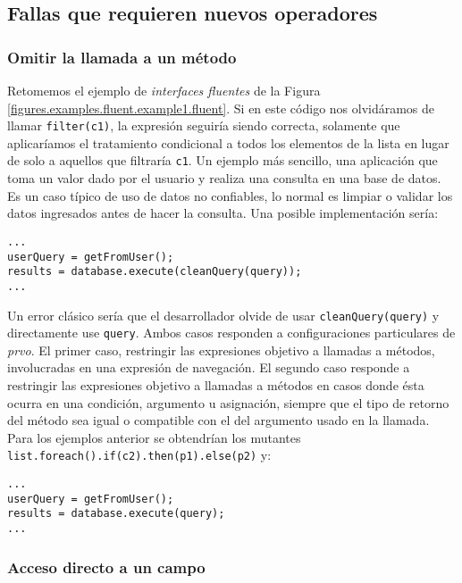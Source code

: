 \subsection{Fallas que requieren nuevos operadores}

\subsubsection{Omitir la llamada a un m\'etodo}

Retomemos el ejemplo de \emph{interfaces fluentes} de la Figura \ref{figures.examples.fluent.example1.fluent}. Si en este c\'odigo nos olvid\'aramos de llamar \texttt{filter(c1)}, la expresi\'on seguir\'ia siendo correcta, solamente que aplicar\'iamos el tratamiento condicional a todos los elementos de la lista en lugar de solo a aquellos que filtrar\'ia \texttt{c1}. Un ejemplo m\'as sencillo, una aplicaci\'on que toma un valor dado por el usuario y realiza una consulta en una base de datos. Es un caso t\'ipico de uso de datos no confiables, lo normal es limpiar o validar los datos ingresados antes de hacer la consulta. Una posible implementaci\'on ser\'ia:
\begin{lstlisting}
...
userQuery = getFromUser();
results = database.execute(cleanQuery(query));
...
\end{lstlisting}
Un error cl\'asico ser\'ia que el desarrollador olvide de usar \texttt{cleanQuery(query)} y directamente use \texttt{query}. Ambos casos responden a configuraciones particulares de \emph{prvo}. El primer caso, restringir las expresiones objetivo a llamadas a m\'etodos, involucradas en una expresi\'on de navegaci\'on. El segundo caso responde a restringir las expresiones objetivo a llamadas a m\'etodos en casos donde \'esta ocurra en una condici\'on, argumento u asignaci\'on, siempre que el tipo de retorno del m\'etodo sea igual o compatible con el del argumento usado en la llamada. Para los ejemplos anterior se obtendr\'ian los mutantes \lstinline|list.foreach().if(c2).then(p1).else(p2)| y:
\begin{lstlisting}
...
userQuery = getFromUser();
results = database.execute(query);
...
\end{lstlisting}

\subsubsection{Acceso directo a un campo}

